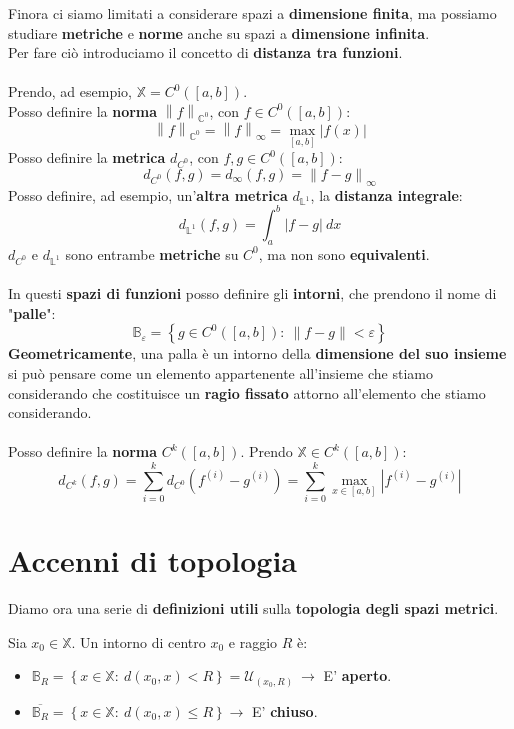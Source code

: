 \documentclass[a4paper, oneside]{article}
\newcommand\X{\mathbb{X}}
\newcommand\C{\mathbb{C}}
\newcommand\B{\mathbb{B}}
\begin{document}
\noindent Finora ci siamo limitati a considerare spazi a \textbf{dimensione finita}, ma possiamo studiare \textbf{metriche} e \textbf{norme} anche su 
spazi a \textbf{dimensione infinita}.\\
Per fare ciò introduciamo il concetto di \textbf{distanza tra funzioni}.\\\\
Prendo, ad esempio, $\X = C^0\left([a,b]\right)$.\\
Posso definire la \textbf{norma} $\left\lVert f\right\rVert_{\C^0}$, con $f\in C^0\left([a,b]\right)$:
\[\left\lVert f\right\rVert_{\C^0} = \left\lVert f\right\rVert_{\infty} = \max_{[a,b]} |f(x)|\]
Posso definire la \textbf{metrica} $d_{C^0}$, con $f,g\in C^0\left([a,b]\right)$:
\[d_{C^0}(f,g) = d_\infty (f,g) = \left\lVert f-g\right\rVert_\infty \]
Posso definire, ad esempio, un'\textbf{altra metrica} $d_{\mathbb{L}^1}$, la \textbf{distanza integrale}:
\[d_{\mathbb{L}^1} (f,g) = \int_{a}^{b} |f-g| \ dx\]
$d_{C^0}$ e $d_{\mathbb{L}^1}$ sono entrambe \textbf{metriche} su $C^0$, ma non sono \textbf{equivalenti}.\\\\

\noindent In questi \textbf{spazi di funzioni} posso definire gli \textbf{intorni}, che prendono il nome di "\textbf{palle}":
\[\B_\varepsilon = \left\{g\in C^0 \left([a,b]\right): \ \left\lVert f-g\right\rVert < \varepsilon \right\}\]
\textbf{Geometricamente}, una palla è un intorno della \textbf{dimensione del suo insieme} si può pensare come un elemento appartenente all'insieme che stiamo considerando che costituisce un \textbf{ragio fissato} attorno all'elemento che stiamo considerando.\\\\
Posso definire la \textbf{norma} $C^k\left([a,b]\right)$. Prendo $\X\in C^k\left([a,b]\right)$:
\[d_{C^k} (f,g) = \sum_{i=0}^{k} d_{C^0} \left(f^{(i)} - g^{(i)}\right) = \sum_{i=0}^{k} \max_{x\in[a,b]} \left|f^{(i)} - g^{(i)}\right|\]

\newpage

\section{Accenni di topologia}
Diamo ora una serie di \textbf{definizioni utili} sulla \textbf{topologia degli spazi metrici}. 

\begin{definition}
    Sia $x_0\in\X$. Un intorno di centro $x_0$ e raggio $R$ è:
    \begin{itemize}
        \item $\B_R = \left\{x\in\X: \ d(x_0,x) < R\right\} = \mathcal{U}_{(x_0,R)} \ \rightarrow$ E' \textbf{aperto}.
        \item $\overline{\B_R} = \left\{x\in\X: \ d(x_0,x) \leq R\right\} \rightarrow$ E' \textbf{chiuso}.
    \end{itemize}
\end{definition}
\end{document}
